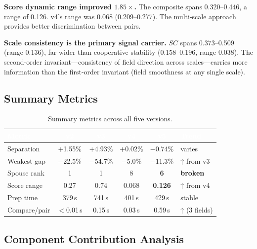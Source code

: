 \documentclass{../yalumba}
\begin{document}
\begin{keyfinding}
\textbf{Score dynamic range improved $1.85\times$.}  The composite spans
0.320--0.446, a range of 0.126.  v4's range was 0.068 (0.209--0.277).
The multi-scale approach provides better discrimination between pairs.
\end{keyfinding}

\begin{keyfinding}
\textbf{Scale consistency is the primary signal carrier.}  $SC$ spans
0.373--0.509 (range 0.136), far wider than cooperative stability
(0.158--0.196, range 0.038).  The second-order invariant---consistency of
field direction across scales---carries more information than the first-order
invariant (field smoothness at any single scale).
\end{keyfinding}

\subsection{Summary Metrics}

\begin{table}[H]
  \centering
  \tablestyle
  \caption{Summary metrics across all five versions.}
  \label{tab:summary}
  \begin{tabular}{lccccl}
    \toprule
    \rowcolor{table-header}
    \textcolor{white}{\textbf{Metric}} &
    \textcolor{white}{\textbf{v2}} &
    \textcolor{white}{\textbf{v3}} &
    \textcolor{white}{\textbf{v4}} &
    \textcolor{white}{\textbf{v5}} &
    \textcolor{white}{\textbf{Trend}} \\
    \midrule
    Separation & $+$1.55\% & $+$4.93\% & $+$0.02\% & $-$0.74\% & varies \\
    Weakest gap & $-$22.5\% & $-$54.7\% & $\mathbf{-5.0\%}$ & $-$11.3\% & ↑ from v3 \\
    Spouse rank & 1 & 1 & 8 & \textbf{6} & \textbf{broken} \\
    Score range & 0.27 & 0.74 & 0.068 & \textbf{0.126} & ↑ from v4 \\
    Prep time & 379\,s & 741\,s & 401\,s & 429\,s & stable \\
    Compare/pair & $<$0.01\,s & 0.15\,s & 0.03\,s & 0.59\,s & ↑ (3 fields) \\
    \bottomrule
  \end{tabular}
\end{table}

\subsection{Component Contribution Analysis}
\end{document}
